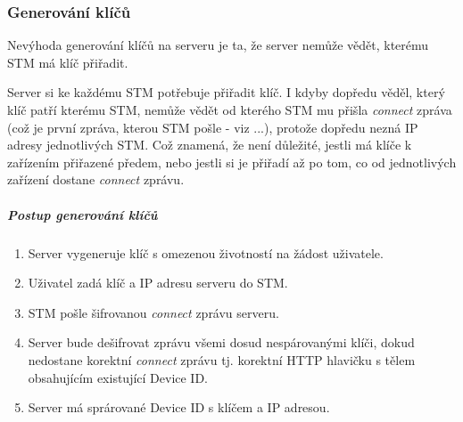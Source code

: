 
\subsubsection{Generování klíčů}

Nevýhoda generování klíčů na serveru je ta, že server nemůže vědět, kterému STM má klíč přiřadit.

Server si ke každému STM potřebuje přiřadit klíč.
I kdyby dopředu věděl, který klíč patří kterému STM, nemůže vědět od kterého STM mu přišla
\emph{connect} zpráva (což je první zpráva, kterou STM pošle - viz ...), protože dopředu nezná
IP adresy jednotlivých STM.
Což znamená, že není důležité, jestli má klíče k zařízením přiřazené předem, nebo jestli
si je přiřadí až po tom, co od jednotlivých zařízení dostane \emph{connect} zprávu.

\subparagraph{Postup generování klíčů}
\begin{enumerate}
    \item Server vygeneruje klíč s omezenou životností na žádost uživatele.
    \item Uživatel zadá klíč a IP adresu serveru do STM.
    \item STM pošle šifrovanou \emph{connect} zprávu serveru.
    \item Server bude dešifrovat zprávu všemi dosud nespárovanými klíči, dokud nedostane korektní
        \emph{connect} zprávu tj. korektní HTTP hlavičku s tělem obsahujícím existující Device ID.
    \item Server má sprárované Device ID s klíčem a IP adresou.
\end{enumerate}



